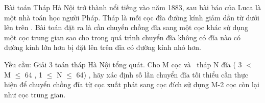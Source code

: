 Bài toán Tháp Hà Nội trở thành nổi tiếng vào năm 1883, sau bài báo của Luca là một nhà toán học người Pháp. Tháp là mỗi cọc đĩa đường kính giảm dần từ dưới lên trên . Bài toán đặt ra là cần chuyển chồng đĩa sang một cọc khác sử dụng một cọc trung gian sao cho trong quá trình chuyển đĩa không có đĩa nào có đường kính lớn hơn bị đặt lên trên đĩa có đường kính nhỏ hơn.  

   Yều cầu: Giải 3 toán tháp Hà Nội tổng quát. Cho M cọc và  tháp N đĩa ( 3 $<$ M  $\le$  64 , 1  $\le$  N  $\le$  64) , hãy xác định số lần chuyển đĩa tối thiểu cần thực hiện để chuyển chồng đĩa từ cọc xuất phát sang cọc đích sử dụng M-2 cọc còn lại như cọc trung gian.  

\